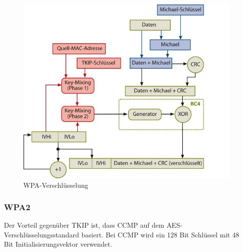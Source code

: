 \begin{figure} [htb]
\begin{centering}
\includegraphics[scale=0.6]{Bilder/wpa_funktionsweise.jpg}
\caption[WPA-Verschlüsselung]{WPA-Verschlüsselung \cite{Heise-WLAN}}
\label{wpa_funktionsweise}
\end{centering}
\end{figure}

\subsubsection{\ac{WPA2}}

Der Vorteil gegenüber \ac{TKIP} ist, dass \ac{CCMP} auf dem \ac{AES}-Verschlüsselungsstandard basiert. Bei \ac{CCMP} wird ein 128 Bit Schlüssel mit 48 Bit Initialisierungsvektor verwendet. \cite{Tanenbaum}


